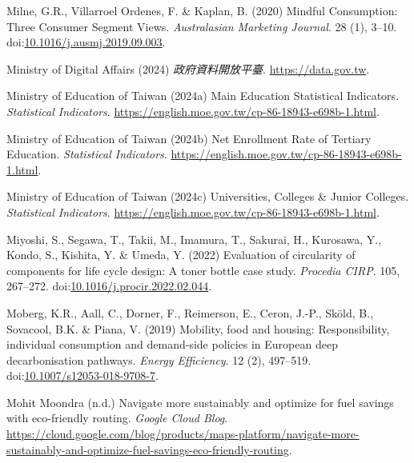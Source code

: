 \documentclass[
  letterpaper,
  DIV=11,
  numbers=noendperiod]{scrartcl}
\newlength{\cslhangindent}
\newenvironment{CSLReferences}[2] %
 {\begin{list}{}{%
  \setlength{\itemindent}{0pt}
  \setlength{\leftmargin}{0pt}
  \setlength{\parsep}{0pt}
  \ifodd #1
   \setlength{\leftmargin}{\cslhangindent}
   \setlength{\itemindent}{-1\cslhangindent}
  \fi
  \setlength{\itemsep}{#2\baselineskip}}}
 {\end{list}}
\begin{document}
\begin{CSLReferences}{0}{1}
Milne, G.R., Villarroel Ordenes, F. \& Kaplan, B. (2020) Mindful
{Consumption}: {Three Consumer Segment Views}. \emph{Australasian
Marketing Journal}. 28 (1), 3--10.
doi:\href{https://doi.org/10.1016/j.ausmj.2019.09.003}{10.1016/j.ausmj.2019.09.003}.

Ministry of Digital Affairs (2024) \emph{{政府資料開放平臺}}.
\url{https://data.gov.tw}.

Ministry of Education of Taiwan (2024a) Main {Education Statistical
Indicators}. \emph{Statistical Indicators}.
\url{https://english.moe.gov.tw/cp-86-18943-e698b-1.html}.

Ministry of Education of Taiwan (2024b) Net {Enrollment Rate} of
{Tertiary Education}. \emph{Statistical Indicators}.
\url{https://english.moe.gov.tw/cp-86-18943-e698b-1.html}.

Ministry of Education of Taiwan (2024c) Universities, {Colleges} \&
{Junior Colleges}. \emph{Statistical Indicators}.
\url{https://english.moe.gov.tw/cp-86-18943-e698b-1.html}.

Miyoshi, S., Segawa, T., Takii, M., Imamura, T., Sakurai, H., Kurosawa,
Y., Kondo, S., Kishita, Y. \& Umeda, Y. (2022) Evaluation of circularity
of components for life cycle design: {A} toner bottle case study.
\emph{Procedia CIRP}. 105, 267--272.
doi:\href{https://doi.org/10.1016/j.procir.2022.02.044}{10.1016/j.procir.2022.02.044}.

Moberg, K.R., Aall, C., Dorner, F., Reimerson, E., Ceron, J.-P., Sköld,
B., Sovacool, B.K. \& Piana, V. (2019) Mobility, food and housing:
Responsibility, individual consumption and demand-side policies in
{European} deep decarbonisation pathways. \emph{Energy Efficiency}. 12
(2), 497--519.
doi:\href{https://doi.org/10.1007/s12053-018-9708-7}{10.1007/s12053-018-9708-7}.

Mohit Moondra (n.d.) Navigate more sustainably and optimize for fuel
savings with eco-friendly routing. \emph{Google Cloud Blog}.
\url{https://cloud.google.com/blog/products/maps-platform/navigate-more-sustainably-and-optimize-fuel-savings-eco-friendly-routing}.


\end{CSLReferences}
\end{document}
